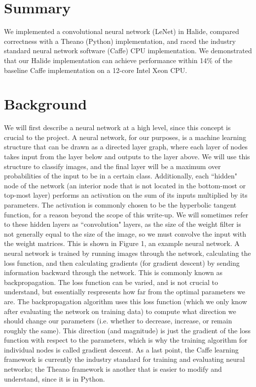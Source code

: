 \documentclass[11pt,twoside]{article}
\begin{document}
\vspace*{0 mm}

\section{Summary}

We implemented a convolutional neural network (LeNet) in Halide, compared correctness with a Theano (Python) implementation, and raced the industry standard neural network software (Caffe) CPU implementation.
We demonstrated that our Halide implementation can achieve performance within 14\% of the baseline Caffe implementation on a 12-core Intel Xeon CPU.

\section{Background}

We will first describe a neural network at a high level, since this concept is crucial to the project.
A neural network, for our purposes, is a machine learning structure that can be drawn as a directed layer graph, where each layer of nodes takes input from the layer below and outputs to the layer above.
We will use this structure to classify images, and the final layer will be a maximum over probabilities of the input to be in a certain class.
Additionally, each ``hidden" node of the network (an interior node that is not located in the bottom-most or top-most layer) performs an activation on the sum of its inputs multiplied by its parameters.
The activation is commonly chosen to be the hyperbolic tangent function, for a reason beyond the scope of this write-up.
We will sometimes refer to these hidden layers as ``convolution" layers, as the size of the weight filter is not generally equal to the size of the image, so we must convolve the input with the weight matrices. 
This is shown in Figure 1, an example neural network.
A neural network is trained by running images through the network, calculating the loss function, and then calculating gradients (for gradient descent) by sending information backward through the network.  
This is commonly known as backpropagation.  
The loss function can be varied, and is not crucial to understand, but essentially respresents how far from the optimal parameters we are.
The backpropagation algorithm uses this loss function (which we only know after evaluating the network on training data) to compute what direction we should change our parameters (i.e. whether to decrease, increase, or remain roughly the same).
This direction (and magnitude) is just the gradient of the loss function with respect to the parameters, which is why the training algorithm for individual nodes is called gradient descent.
As a last point, the Caffe learning framework is currently the industry standard for training and evaluating neural networks; the Theano framework is another that is easier to modify and understand, since it is in Python.
\end{document}
